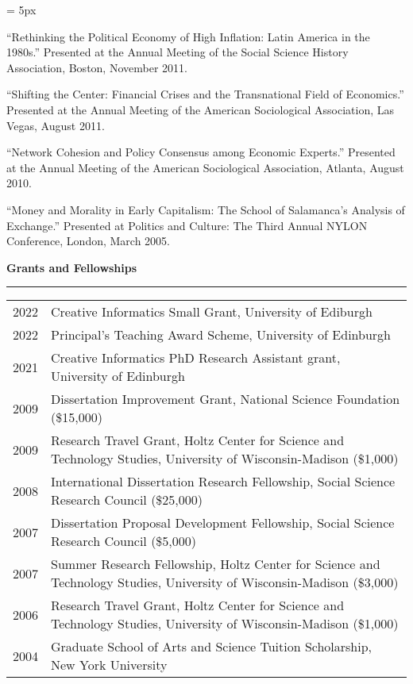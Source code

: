 \documentclass[12pt,letterpaper]{article}
\renewcommand{\labelitemi}{$$}
\newcommand{\sectionhead}[1]{\begin{flushleft}\large\bf{#1}\vspace{.1cm}\hrule\end{flushleft}}
\begin{document}
\begin{list}{\labelitemi}{\leftmargin = 5px}
\item``Rethinking the Political Economy of High Inflation: Latin America in the 1980s.'' Presented at the Annual Meeting of the Social Science History Association, Boston, November 2011.

\item``Shifting the Center: Financial Crises and the Transnational Field of Economics.'' Presented at the Annual Meeting of the American Sociological Association, Las Vegas, August 2011.

\item``Network Cohesion and Policy Consensus among Economic Experts.'' Presented at the Annual Meeting of the American Sociological Association, Atlanta, August 2010.

\item``Money and Morality in Early Capitalism: The School of Salamanca's Analysis of Exchange.''  Presented at Politics and Culture: The Third Annual NYLON Conference, London, March 2005.
\end{list}


\sectionhead{Grants and Fellowships}
\begin{tabulary}{.97\textwidth}{@{}p{2.5cm}  L}

2022 & Creative Informatics Small Grant, University of Ediburgh\\
2022 & Principal's Teaching Award Scheme, University of Edinburgh\\
2021 & Creative Informatics PhD Research Assistant grant, University of Edinburgh\\
2009 & Dissertation Improvement Grant, National Science Foundation (\$15,000)\\
2009 & Research Travel Grant, Holtz Center for Science and Technology Studies, University of Wisconsin-Madison (\$1,000)\\
2008 & International Dissertation Research Fellowship, Social Science Research Council (\$25,000)\\
2007 & Dissertation Proposal Development Fellowship, Social Science Research Council (\$5,000)\\
2007 & Summer Research Fellowship, Holtz Center for Science and Technology Studies, University of Wisconsin-Madison (\$3,000)\\
2006 & Research Travel Grant, Holtz Center for Science and Technology Studies, University of Wisconsin-Madison (\$1,000)\\
2004 & Graduate School of Arts and Science Tuition Scholarship, New York University\\ 
\end{tabulary}
\end{document}
